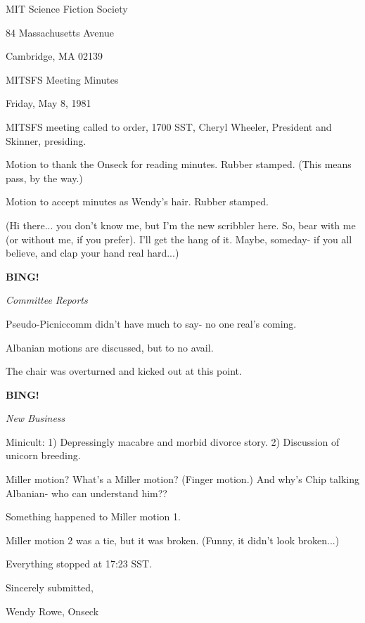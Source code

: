 \documentclass[12pt]{article}
\newcommand{\bing}{{\bf BING!} }
\newcommand{\goto}[1]{\bing \vskip 12pt \centerline{{\em{#1}}}}
\begin{document}
\begin{center}

MIT Science Fiction Society 

84 Massachusetts Avenue

Cambridge, MA 02139

\vspace{12pt}

MITSFS Meeting Minutes 

Friday, May 8, 1981

\end{center}
 
\vspace{18pt}

\setlength{\parskip}{6pt}

\noindent
MITSFS meeting called to order, 1700 SST,
Cheryl Wheeler, President and Skinner, presiding.

Motion to thank the Onseck for reading minutes. Rubber stamped. (This means pass, by the way.)

Motion to accept minutes as Wendy's hair. Rubber stamped.

(Hi there... you don't know me, but I'm the new scribbler here. So, bear with me (or without me, if you prefer). I'll get the hang of it. Maybe, someday- if you all believe, and clap your hand real hard...)

\goto{Committee Reports}

Pseudo-Picniccomm didn't have much to say- no one real's coming.

Albanian motions are discussed, but to no avail.

The chair was overturned and kicked out at this point.

\goto{New Business}

Minicult: 1) Depressingly macabre and morbid divorce story. 2) Discussion of unicorn breeding.

Miller motion? What's a Miller motion? (Finger motion.) And why's Chip talking Albanian- who can understand him??

Something happened to Miller motion 1.

Miller motion 2 was a tie, but it was broken. (Funny, it didn't look broken...)

\vspace{12pt}

\noindent
Everything stopped at 17:23 SST.

\vspace{18pt}

\centerline{Sincerely submitted,}
\centerline{Wendy Rowe, Onseck}
\end{document}
